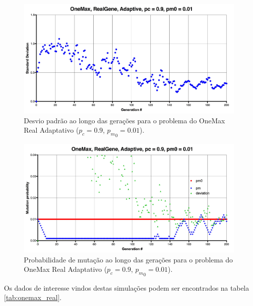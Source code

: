 \begin{figure}[ht!]
    \centering \includegraphics[width=1.0\textwidth]{onemax_real_adaptive_std.jpg}
    \caption{Desvio padrão ao longo das gerações para o problema do OneMax Real Adaptativo ($p_c=0.9$, ${p_m}_0=0.01$).}
    \label{fig:onemax_real_adaptive_std}
\end{figure}

\begin{figure}[ht!]
    \centering \includegraphics[width=1.0\textwidth]{onemax_real_adaptive_pm.jpg}
    \caption{Probabilidade de mutação ao longo das gerações para o problema do OneMax Real Adaptativo ($p_c=0.9$, ${p_m}_0=0.01$).}
    \label{fig:onemax_real_adaptive_pm}
\end{figure}

Os dados de interesse vindos destas simulações podem ser encontrados na tabela  \ref{tab:onemax_real}.

